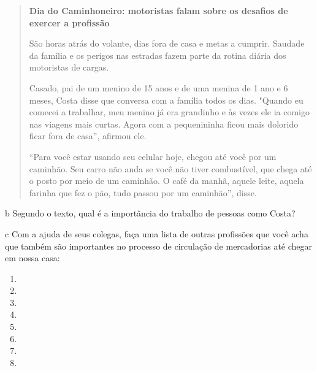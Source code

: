 \begin{quote}
\textbf{Dia do Caminhoneiro: motoristas falam sobre os desafios de
exercer a profissão}

São horas atrás do volante, dias fora de casa e metas a cumprir. Saudade
da família e os perigos nas estradas fazem parte da rotina diária dos
motoristas de cargas.

Casado, pai de um menino de 15 anos e de uma menina de 1 ano e 6 meses,
Costa disse que conversa com a família todos os dias. "Quando eu comecei
a trabalhar, meu menino já era grandinho e às vezes ele ia comigo nas
viagens mais curtas. Agora com a pequenininha ficou mais dolorido ficar
fora de casa'', afirmou ele.

``Para você estar usando seu celular hoje, chegou até você por um
caminhão. Seu carro não anda se você não tiver combustível, que chega
até o posto por meio de um caminhão. O café da manhã, aquele leite,
aquela farinha que fez o pão, tudo passou por um caminhão'', disse.

\end{quote}

\num{b} Segundo o texto, qual é a importância do trabalho de pessoas como Costa?


\num{c} Com a ajuda de seus colegas, faça uma lista de outras profissões que
você acha que também são importantes no processo de circulação de
mercadorias até chegar em nossa casa:

\begin{enumerate}
\item \preencher

\item \preencher

\item \preencher

\item \preencher

\item \preencher

\item \preencher

\item \preencher

\item \preencher
\end{enumerate}

